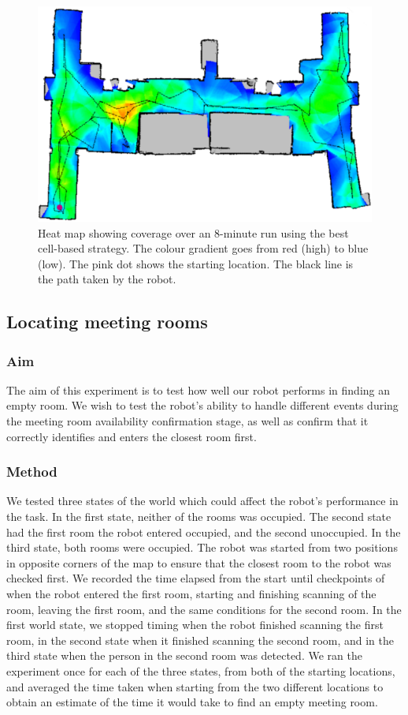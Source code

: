 \documentclass[conference]{IEEEtran}
\begin{document}
\begin{figure}
  \includegraphics[width=\columnwidth]{4-1_1}
  \caption{Heat map showing coverage over an 8-minute run using the best cell-based strategy. The colour gradient goes from red (high) to blue (low). The pink dot shows the starting location. The black line is the path taken by the robot.}
  \label{fig:heatmap}
\end{figure}

\subsection{Locating meeting rooms}

\subsubsection{Aim}
The aim of this experiment is to test how well our robot performs in finding an empty room. We wish to test the robot's ability to handle different events during the meeting room availability confirmation stage, as well as confirm that it correctly identifies and enters the closest room first.
\subsubsection{Method}
We tested three states of the world which could affect the robot's performance in the task. In the first state, neither of the rooms was occupied. The second state had the first room the robot entered occupied, and the second unoccupied. In the third state, both rooms were occupied. The robot was started from two positions in opposite corners of the map to ensure that the closest room to the robot was checked first. We recorded the time elapsed from the start until checkpoints of when the robot entered the first room, starting and finishing scanning of the room, leaving the first room, and the same conditions for the second room. In the first world state, we stopped timing when the robot finished scanning the first room, in the second state when it finished scanning the second room, and in the third state when the person in the second room was detected. We ran the experiment once for each of the three states, from both of the starting locations, and averaged the time taken when starting from the two different locations to obtain an estimate of the time it would take to find an empty meeting room.
\end{document}
